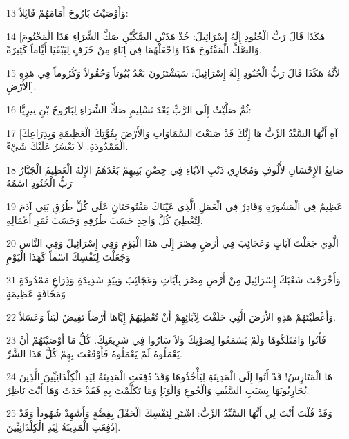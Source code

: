 \par 13 وَأَوْصَيْتُ بَارُوخَ أَمَامَهُمْ قَائِلاً:
\par 14 [هَكَذَا قَالَ رَبُّ الْجُنُودِ إِلَهُ إِسْرَائِيلَ: خُذْ هَذَيْنِ الصَّكَّيْنِ صَكَّ الشِّرَاءِ هَذَا الْمَخْتُومَ وَالصَّكَّ الْمَفْتُوحَ هَذَا وَاجْعَلْهُمَا فِي إِنَاءٍ مِنْ خَزَفٍ لِيَبْقَيَا أَيَّاماً كَثِيرَةً.
\par 15 لأَنَّهُ هَكَذَا قَالَ رَبُّ الْجُنُودِ إِلَهُ إِسْرَائِيلَ: سَيَشْتَرُونَ بَعْدُ بُيُوتاً وَحُقُولاً وَكُرُوماً فِي هَذِهِ الأَرْضِ].
\par 16 ثُمَّ صَلَّيْتُ إِلَى الرَّبِّ بَعْدَ تَسْلِيمِ صَكِّ الشِّرَاءِ لِبَارُوخَ بْنِ نِيرِيَّا:
\par 17 [آهِ أَيُّهَا السَّيِّدُ الرَّبُّ هَا إِنَّكَ قَدْ صَنَعْتَ السَّمَاوَاتِ وَالأَرْضَ بِقُوَّتِكَ الْعَظِيمَةِ وَبِذِرَاعِكَ الْمَمْدُودَةِ. لاَ يَعْسُرُ عَلَيْكَ شَيْءٌ.
\par 18 صَانِعُ الإِحْسَانِ لأُلُوفٍ وَمُجَازِي ذَنْبِ الآبَاءِ فِي حِضْنِ بَنِيهِمْ بَعْدَهُمُ الإِلَهُ الْعَظِيمُ الْجَبَّارُ رَبُّ الْجُنُودِ اسْمُهُ
\par 19 عَظِيمٌ فِي الْمَشُورَةِ وَقَادِرٌ فِي الْعَمَلِ الَّذِي عَيْنَاكَ مَفْتُوحَتَانِ عَلَى كُلِّ طُرُقِ بَنِي آدَمَ لِتُعْطِيَ كُلَّ وَاحِدٍ حَسَبَ طُرُقِهِ وَحَسَبَ ثَمَرِ أَعْمَالِهِ.
\par 20 الَّذِي جَعَلْتَ آيَاتٍ وَعَجَائِبَ فِي أَرْضِ مِصْرَ إِلَى هَذَا الْيَوْمِ وَفِي إِسْرَائِيلَ وَفِي النَّاسِ وَجَعَلْتَ لِنَفْسِكَ اسْماً كَهَذَا الْيَوْمِ
\par 21 وَأَخْرَجْتَ شَعْبَكَ إِسْرَائِيلَ مِنْ أَرْضِ مِصْرَ بِآيَاتٍ وَعَجَائِبَ وَبِيَدٍ شَدِيدَةٍ وَذِرَاعٍ مَمْدُودَةٍ وَمَخَافَةٍ عَظِيمَةٍ
\par 22 وَأَعْطَيْتَهُمْ هَذِهِ الأَرْضَ الَّتِي حَلَفْتَ لِآبَائِهِمْ أَنْ تُعْطِيَهُمْ إِيَّاهَا أَرْضاً تَفِيضُ لَبَناً وَعَسَلاً.
\par 23 فَأَتُوا وَامْتَلَكُوهَا وَلَمْ يَسْمَعُوا لِصَوْتِكَ وَلاَ سَارُوا فِي شَرِيعَتِكَ. كُلُّ مَا أَوْصَيْتَهُمْ أَنْ يَعْمَلُوهُ لَمْ يَعْمَلُوهُ فَأَوْقَعْتَ بِهِمْ كُلَّ هَذَا الشَّرِّ.
\par 24 هَا الْمَتَارِسُ! قَدْ أَتُوا إِلَى الْمَدِينَةِ لِيَأْخُذُوهَا وَقَدْ دُفِعَتِ الْمَدِينَةُ لِيَدِ الْكِلْدَانِيِّينَ الَّذِينَ يُحَارِبُونَهَا بِسَبَبِ السَّيْفِ وَالْجُوعِ وَالْوَبَإِ وَمَا تَكَلَّمْتَ بِهِ فَقَدْ حَدَثَ وَهَا أَنْتَ نَاظِرٌ.
\par 25 وَقَدْ قُلْتَ أَنْتَ لِي أَيُّهَا السَّيِّدُ الرَّبُّ: اشْتَرِ لِنَفْسِكَ الْحَقْلَ بِفِضَّةٍ وَأَشْهِدْ شُهُوداً وَقَدْ دُفِعَتِ الْمَدِينَةُ لِيَدِ الْكِلْدَانِيِّينَ].
